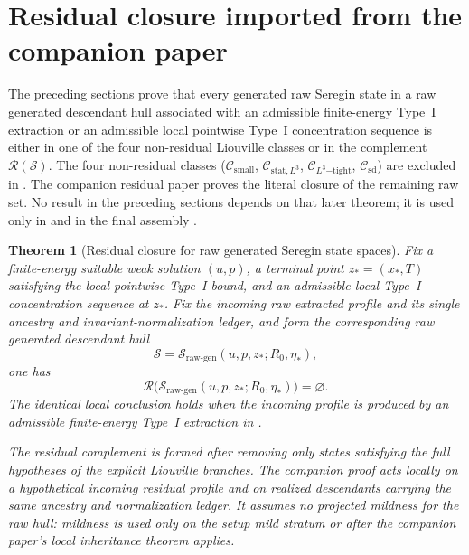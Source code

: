 \documentclass[11pt]{amsart}
\theoremstyle{plain}
\newtheorem{theorem}{Theorem}[section]
\theoremstyle{definition}
\theoremstyle{remark}
\numberwithin{equation}{section}
\newcommand{\calS}{\mathcal S}
\newcommand{\calR}{\mathcal R}
\newcommand{\calC}{\mathcal C}
\begin{document}
\section{Residual closure imported from the companion paper}
\label{p1:sec:criterion}

The preceding sections prove that every generated raw Seregin state in a raw
generated descendant hull associated with an admissible finite-energy Type~I
extraction or an admissible local pointwise Type~I concentration sequence is
either in one of the four non-residual Liouville classes or in the complement
\(\calR(\calS)\).  The four non-residual classes
(\(\calC_{\mathrm{small}}\), \(\calC_{\mathrm{stat},L^3}\),
\(\calC_{L^3\mathrm{-tight}}\), \(\calC_{\mathrm{sd}}\)) are excluded in
.  The companion residual paper proves the
literal closure of the remaining raw set.  No result in the preceding sections
depends on that later theorem; it is used only in
 and in the final assembly
.

\begin{theorem}[Residual closure for raw generated Seregin state spaces]
\label{p1:hyp:no-remainder}
Fix a finite-energy suitable weak solution \((u,p)\), a terminal point
\(z_*=(x_*,T)\) satisfying the local pointwise Type~I bound, and an admissible
local Type~I concentration sequence at \(z_*\).  Fix the incoming raw extracted
profile and its single ancestry and invariant-normalization ledger, and form
the corresponding raw generated descendant hull
\[
   \calS=\calS_{\mathrm{raw\text{-}gen}}(u,p,z_*;R_0,\eta_*),
\]
one has
\[
   \calR\bigl(
      \calS_{\mathrm{raw\text{-}gen}}(u,p,z_*;R_0,\eta_*)
   \bigr)=\varnothing .
\]
The identical local conclusion holds when the incoming profile is produced by
an admissible finite-energy Type~I extraction in
.

The residual complement is formed after removing only states satisfying the
full hypotheses of the explicit Liouville branches.  The companion proof acts
locally on a hypothetical incoming residual profile and on realized
descendants carrying the same ancestry and normalization ledger.  It assumes
no projected mildness for the raw hull: mildness is used only on the setup mild
stratum or after the companion paper's local inheritance theorem applies.
\end{theorem}
\end{document}
